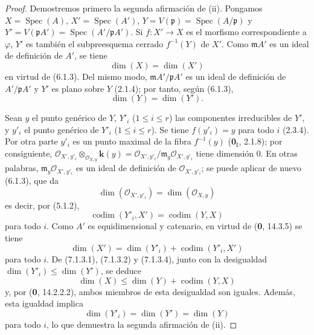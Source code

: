 \begin{proof}
Demostremos primero la segunda afirmación de (ii).
Pongamos $X=\operatorname{Spec}(A)$,
$X'=\operatorname{Spec}(A')$,
$Y=V(\mathfrak p)=\operatorname{Spec}(A/\mathfrak p)$
y $Y'=V(\mathfrak pA')=\operatorname{Spec}(A'/\mathfrak pA')$.
Si $f:X'\to X$ es el morfismo correspondiente a
$\varphi$, $Y'$ es también el subpreesquema cerrado
$f^{-1}(Y)$ de $X'$. Como $\mathfrak mA'$ es un ideal
de definición de $A'$, se tiene
\begin{equation}
\dim(X)=\dim(X')
\tag{7.1.3.1}
\label{IV.2.eq.7.1.3.1-fr}
\end{equation}
en virtud de (6.1.3). Del mismo modo,
$\mathfrak mA'/\mathfrak pA'$ es un ideal de definición
de $A'/\mathfrak pA'$ y $Y'$ es plano sobre $Y$ (2.1.4);
por tanto, según (6.1.3),
\begin{equation}
\dim(Y)=\dim(Y').
\tag{7.1.3.2}
\label{IV.2.eq.7.1.3.2-fr}
\end{equation}

Sean $y$ el punto genérico de $Y$, $Y'_i$
($1\leqslant i\leqslant r$) las componentes irreducibles
de $Y'$, y $y'_i$ el punto genérico de $Y'_i$
($1\leqslant i\leqslant r$). Se tiene $f(y'_i)=y$
para todo $i$ (2.3.4). Por otra parte $y'_i$ es un
punto maximal de la fibra $f^{-1}(y)$
(\textbf 0$_{\mathrm
I}$, 2.1.8); por consiguiente,
$\mathscr O_{X',y'_i}\otimes_{\mathscr O_{X,y}}\boldsymbol{k}(y)=
\mathscr O_{X',y'_i}/\mathfrak m_y\mathscr O_{X',y'_i}$
tiene dimensión 0. En otras palabras,
$\mathfrak m_y\mathscr O_{X',y'_i}$ es un ideal de definición
de $\mathscr O_{X',y'_i}$; se puede aplicar de nuevo
(6.1.3), que da
\begin{equation}
\dim(\mathscr O_{X',y'_i})=\dim(\mathscr O_{X,y})
\tag{7.1.3.3}
\label{IV.2.eq.7.1.3.3-fr}
\end{equation}
es decir, por (5.1.2),
\begin{equation}
\operatorname{codim}(Y'_i,X')=\operatorname{codim}(Y,X)
\tag{7.1.3.4}
\label{IV.2.eq.7.1.3.4-fr}
\end{equation}
para todo $i$. Como $A'$ es equidimensional y
catenario, en virtud de (\textbf 0, 14.3.5) se tiene
\begin{equation}
\dim(X')=\dim(Y'_i)+\operatorname{codim}(Y'_i,X')
\tag{7.1.3.5}
\label{IV.2.eq.7.1.3.5-fr}
\end{equation}
para todo $i$. De (7.1.3.1), (7.1.3.2) y
(7.1.3.4), junto con la desigualdad
$\dim(Y'_i)\leqslant\dim(Y')$, se deduce
\begin{equation}
\dim(X)\leqslant\dim(Y)+\operatorname{codim}(Y,X)
\tag{7.1.3.6}
\label{IV.2.eq.7.1.3.6-fr}
\end{equation}
y, por (\textbf 0, 14.2.2.2), ambos miembros de esta
desigualdad son iguales. Además, esta igualdad implica
\begin{equation}
\dim(Y'_i)=\dim(Y')=\dim(Y)
\tag{7.1.3.7}
\label{IV.2.eq.7.1.3.7-fr}
\end{equation}
para todo $i$, lo que demuestra la segunda afirmación
de (ii).


\end{proof}
